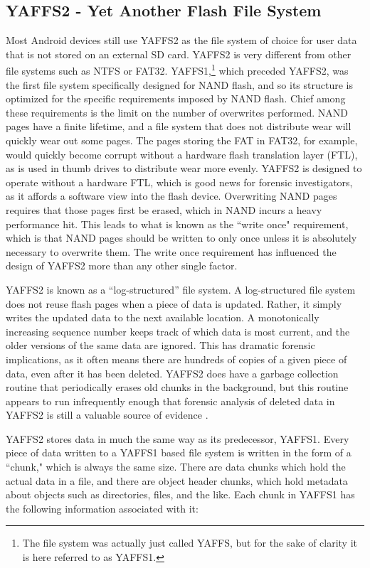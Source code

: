 \subsection{YAFFS2 - Yet Another Flash File System} Most Android devices still use YAFFS2 as the file system of choice for user data
that is not stored on an external SD card.  YAFFS2 is very different from other file systems such as NTFS or FAT32.
YAFFS1,\footnote{The file system was actually just called YAFFS, but for the sake of clarity it is here referred to as YAFFS1.} which
preceded YAFFS2,  was the first file system specifically designed for NAND flash, and so its structure is optimized for the specific
requirements imposed by NAND flash.  Chief among these requirements is the limit on the number of overwrites performed.  NAND pages
have a finite lifetime, and a file system that does not distribute wear will quickly wear out some pages.  The pages storing the FAT
in FAT32, for example, would quickly become corrupt without a hardware flash translation layer (FTL), as is used in thumb drives to
distribute wear more evenly.  YAFFS2 is designed to operate without a hardware FTL, which is good news for forensic investigators,
as it affords a software view into the flash device.  Overwriting NAND pages requires that those pages first be erased, which in
NAND incurs a heavy performance hit.  This leads to what is known as the ``write once" requirement, which is that NAND pages should
be written to only once unless it is absolutely necessary to overwrite them. The write once requirement has influenced the design of
YAFFS2 more than any other single factor.

YAFFS2 is known as a ``log-structured'' file system.  A log-structured file system does not reuse flash pages when a piece of data is
updated.  Rather, it simply writes the updated data to the next available location.  A monotonically increasing sequence number
keeps track of which data is most current, and the older versions of the same data are ignored.  This has dramatic forensic
implications, as it often means there are hundreds of copies of a given piece of data, even after it has been deleted.  YAFFS2 does
have a garbage collection routine that periodically erases old chunks in the background, but this routine appears to run
infrequently enough that forensic analysis of deleted data in YAFFS2 is still a valuable source of evidence \cite{naval}. 

YAFFS2 stores data in much the same way as its predecessor, YAFFS1.  Every piece of data written to a YAFFS1 based file system is
written in the form of a ``chunk," which is always the same size.  There are data chunks which hold the actual data in a file, and
there are object header chunks, which hold metadata about objects such as directories, files, and the like.  Each chunk in YAFFS1
has the following information associated with it:

